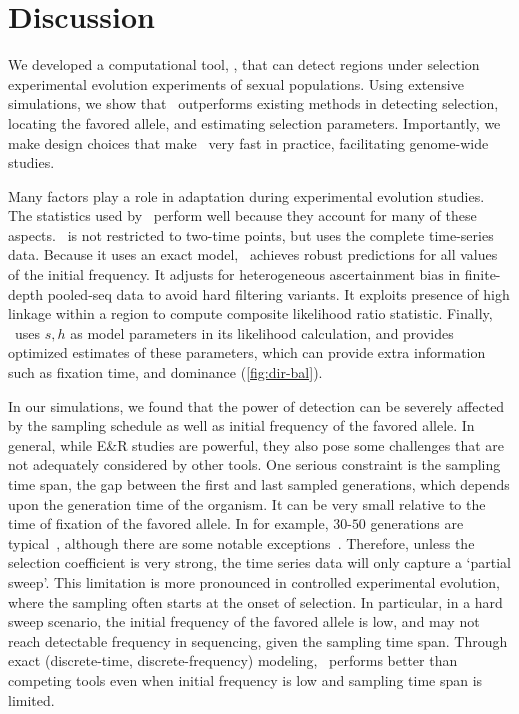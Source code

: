 \section{Discussion}
We developed a computational tool, \comale, that can detect regions
under selection experimental evolution experiments of sexual
populations. Using extensive simulations, we show that \comale\
outperforms existing methods in detecting selection, locating the
favored allele, and estimating selection parameters. Importantly, we
make design choices that make \comale\ very fast in practice,
facilitating genome-wide studies.


Many factors play a role in adaptation during experimental evolution
studies. The statistics used by \comale\ perform well because they
account for many of these aspects. \comale\ is not restricted to
two-time points, but uses the complete time-series data. Because it
uses an exact model, \comale\ achieves robust predictions for all
values of the initial frequency. It adjusts for heterogeneous
ascertainment bias in finite-depth pooled-seq data to avoid hard
filtering variants. It exploits presence of high linkage within a
region to compute composite likelihood ratio statistic. Finally,
\comale\ uses $s,h$ as model parameters in its likelihood calculation,
and provides optimized estimates of these parameters, which can
provide extra information such as fixation time, and dominance 
(\ref{fig:dir-bal}).

In our simulations, we found that the power of detection can be
severely affected by the sampling schedule as well as initial
frequency of the favored allele.  In general, while E\&R studies are
powerful, they also pose some challenges that are not adequately
considered by other tools. One serious constraint is the sampling time
span, the gap between the first and last sampled generations, which
depends upon the generation time of the organism. It can be very small
relative to the time of fixation of the favored allele. In \dmel for
example, $30$-$50$ generations are typical~\cite{kofler2013guide},
although there are some notable
exceptions~\cite{zhou2011experimental}.  Therefore, unless the
selection coefficient is very strong, the time series data will only
capture a `partial sweep'. This limitation is more pronounced in
controlled experimental evolution, where the sampling often starts at
the onset of selection. In particular, in a hard sweep scenario, the
initial frequency of the favored allele is low, and may not reach
detectable frequency in sequencing, given the sampling time
span. Through exact (discrete-time, discrete-frequency) modeling,
\comale\ performs better than competing tools even when initial
frequency is low and sampling time span is limited.


